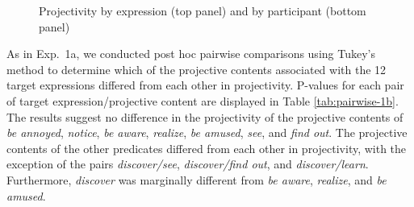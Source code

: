 \documentclass[11pt,fleqn]{article}
\newcommand{\6}{\mbox{$[\hspace*{-.6mm}[$}}
\newcommand{\9}{\mbox{$]\hspace*{-.6mm}]$}}
\newcommand{\tableref}[1]{Table \ref{#1}}
\begin{document}
\begin{figure}[!h]
\centering


	
\caption{Projectivity by expression (top panel) and by participant (bottom panel)}\label{fig:f-proj-1b}
\end{figure}

As in Exp.~1a,  we conducted post hoc pairwise comparisons using Tukey's method to determine which of the projective contents associated with the 12 target expressions differed from each other in projectivity. P-values for each pair of target expression/projective content are displayed in \tableref{tab:pairwise-1b}. The results suggest no difference in the projectivity of the projective contents of \emph{be annoyed}, \emph{notice}, \emph{be aware}, \emph{realize}, \emph{be amused}, \emph{see}, and \emph{find out}. The projective contents of the other predicates differed from each other in projectivity, with the exception of the pairs \emph{discover/see}, \emph{discover/find out}, and \emph{discover/learn}. Furthermore, \emph{discover} was  marginally different from \emph{be aware}, \emph{realize}, and \emph{be amused}.
\end{document}
